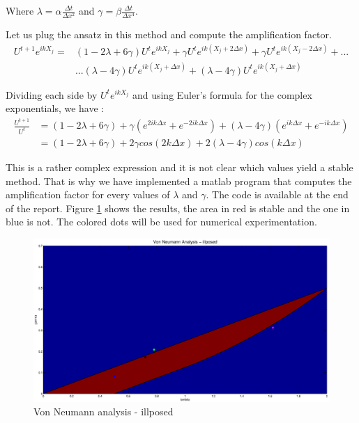 Where  $\lambda = \alpha\frac{\Delta t}{\Delta x^2}$ and $\gamma = \beta \frac{\Delta t}{\Delta x^4}$.

Let us plug the ansatz in this method and compute the amplification factor.
\begin{align*}
U^{t+1}e^{ikX_j} = &(1-2\lambda+6\gamma)U^{t}e^{ikX_j} + \gamma U^te^{ik(X_j+2\Delta x)}+ \gamma U^te^{ik(X_j-2\Delta x)}+...\\
&...(\lambda - 4\gamma) U^te^{ik(X_j+\Delta x)}+(\lambda - 4\gamma) U^te^{ik(X_j+\Delta x)}
\end{align*}

Dividing each side by $U^{t}e^{ikX_j}$ and using Euler's formula for the complex exponentials, we have :
\begin{align*}
\frac{U^{t+1}}{U^t} &= (1-2\lambda+6\gamma) + \gamma (e^{2ik\Delta x}+e^{-2ik\Delta x})+(\lambda - 4\gamma)(e^{ik\Delta x}+e^{-ik\Delta x})\\
&=(1-2\lambda+6\gamma) + 2\gamma cos(2k\Delta x) + 2(\lambda - 4\gamma)cos(k\Delta x)
\end{align*}

This is a rather complex expression and it is not clear which values yield a stable method. That is why we have implemented a matlab program that computes the amplification factor for every values of $\lambda$ and $\gamma$. The code is available at the end of the report. Figure \ref{reg2} shows the results, the area in red is stable and the one in blue is not. The colored dots will be used for numerical experimentation.

\begin{figure}
\begin{center}
\includegraphics[scale=0.4]{reg2.eps}
\caption{Von Neumann analysis - illposed}
\label{reg2}
\end{center}
\end{figure}


